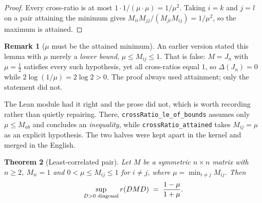 \documentclass[11pt,a4paper]{article}
\theoremstyle{plain}
\newtheorem{theorem}{Theorem}[section]
\theoremstyle{definition}
\newtheorem{remark}[theorem]{Remark}
\begin{document}
\begin{proof}
Every cross-ratio is at most $1\cdot 1/(\mu\cdot\mu)=1/\mu^2$. Taking $i=k$ and
$j=l$ on a pair attaining the minimum gives
$M_{ii}M_{jj}/(M_{ji}M_{ij})=1/\mu^2$, so the maximum is attained.
\end{proof}

\begin{remark}[$\mu$ must be the attained minimum]\label{rem:attmin}
An earlier version stated this lemma with $\mu$ merely a \emph{lower bound},
$\mu\le M_{ij}\le1$. That is false: $M=J_n$ with $\mu=\tfrac12$ satisfies every
such hypothesis, yet all cross-ratios equal $1$, so $\Delta(J_n)=0$ while
$2\log(1/\mu)=2\log 2>0$. The proof always used attainment; only the statement
did not.

The Lean module had it right and the prose did not, which is worth recording
rather than quietly repairing. There, \verb|crossRatio_le_of_bounds| assumes only
$\mu\le M_{ab}$ and concludes an \emph{inequality}, while
\verb|crossRatio_attained| takes $M_{ij}=\mu$ as an explicit hypothesis. The two
halves were kept apart in the kernel and merged in the English.
\end{remark}

\begin{theorem}[Least-correlated pair]\label{thm:lcp}
Let $M$ be a symmetric $n\times n$ matrix with $n\ge2$, $M_{ii}=1$ and
$0<\mu\le M_{ij}\le 1$ for $i\neq j$, where $\mu=\min_{i\neq j}M_{ij}$. Then
\[
  \sup_{D>0 \textup{ diagonal}} r(DMD) \;=\; \frac{1-\mu}{1+\mu}.
\]
\end{theorem}
\end{document}
